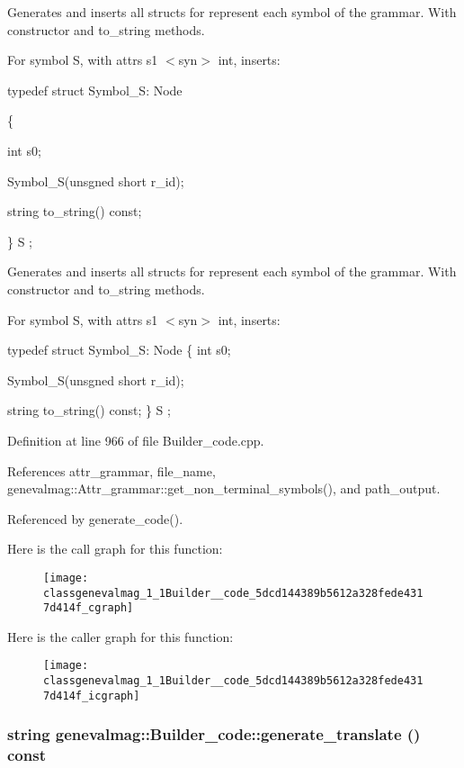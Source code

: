 Generates and inserts all structs for represent each symbol of the grammar. With constructor and to\_\-string methods.

For symbol S, with attrs s1 $<$syn$>$ int, inserts:\par
 \par
 typedef struct Symbol\_\-S: Node\par
 \{\par
 int s0;\par
 \par
 Symbol\_\-S(unsgned short r\_\-id);\par
 \par
 string to\_\-string() const;\par
 \} S ;\par


Generates and inserts all structs for represent each symbol of the grammar. With constructor and to\_\-string methods.

For symbol S, with attrs s1 $<$syn$>$ int, inserts:

typedef struct Symbol\_\-S: Node \{ int s0;

Symbol\_\-S(unsgned short r\_\-id);

string to\_\-string() const; \} S ; 

Definition at line 966 of file Builder\_\-code.cpp.

References attr\_\-grammar, file\_\-name, genevalmag::Attr\_\-grammar::get\_\-non\_\-terminal\_\-symbols(), and path\_\-output.

Referenced by generate\_\-code().

Here is the call graph for this function:\nopagebreak
\begin{figure}[H]
\begin{center}
\leavevmode
\texttt{[image: classgenevalmag\_1\_1Builder\_\_code\_5dcd144389b5612a328fede4317d414f\_cgraph]}
\end{center}
\end{figure}


Here is the caller graph for this function:\nopagebreak
\begin{figure}[H]
\begin{center}
\leavevmode
\texttt{[image: classgenevalmag\_1\_1Builder\_\_code\_5dcd144389b5612a328fede4317d414f\_icgraph]}
\end{center}
\end{figure}
\hypertarget{classgenevalmag_1_1Builder__code_b8a711e35ef2a06238854398ce9ed0e6}{
\subsubsection[{generate\_\-translate}]{\setlength{\rightskip}{0pt plus 5cm}string genevalmag::Builder\_\-code::generate\_\-translate () const}}
\label{classgenevalmag_1_1Builder__code_b8a711e35ef2a06238854398ce9ed0e6}


